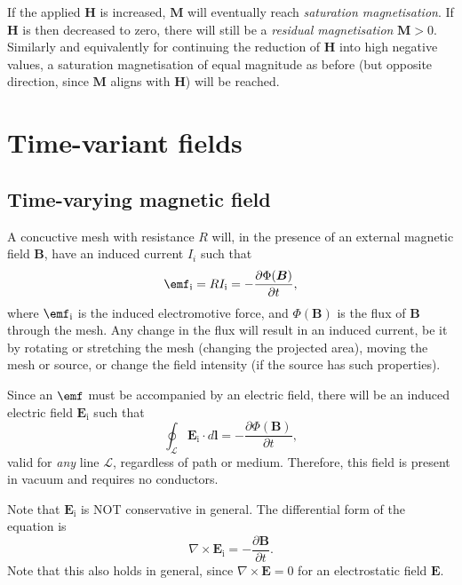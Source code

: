 \documentclass[a4paper, 12pt]{article}
\renewcommand{\vec}[1]{\bm{#1}}
\newcommand{\E}{\ensuremath{\vec{E}}}
\newcommand{\B}{\ensuremath{\vec{B}}}
\renewcommand{\H}{\ensuremath{\vec{H}}}
\begin{document}
            If the applied \H{} is increased, $\vec{M}$ will eventually reach \textit{saturation magnetisation}. 
            If \H{} is then decreased to zero, there will still be a \textit{residual magnetisation} $\vec{M} > 0$. 
            Similarly and equivalently for continuing the reduction of \H{} into high negative values, 
            a saturation magnetisation of equal magnitude as before (but opposite direction, since $\vec{M}$ aligns with \H) will be reached.

        
\section{Time-variant fields}
    \subsection{Time-varying magnetic field}
        A concuctive mesh with resistance $R$ will, in the presence of an external magnetic field \B, 
        have an induced current $I_i$ such that
        \begin{equation}
            \emf_\text{i} = RI_\text{i} = -\frac{\partial \Phi(\B)}{\partial t},
        \end{equation}
        where $\emf_\text{i}$ is the induced electromotive force, and $\Phi(\B)$ is the flux of \B{} through the mesh. 
        Any change in the flux will result in an induced current, 
        be it by rotating or stretching the mesh (changing the projected area),
        moving the mesh or source, or change the field intensity (if the source has such properties).

        Since an $\emf$ must be accompanied by an electric field, 
        there will be an induced electric field $\E_\text{i}$ such that
        \begin{equation}
            \oint_\mathcal{L}\E_\text{i}\cdot d\vec{l} = -\frac{\partial \Phi(\B)}{\partial t},
        \end{equation}
        valid for \textit{any} line $\mathcal{L}$, regardless of path or medium. 
        Therefore, this field is present in vacuum and requires no conductors.

        Note that $\E_\text{i}$ is NOT conservative in general. The differential form of the equation is
        \begin{equation}
            \nabla \times \E_\text{i} = -\frac{\partial \B}{\partial t}.
        \end{equation}
        Note that this also holds in general, since $\nabla\times\E = 0$ for an electrostatic field \E.
    
\end{document}
